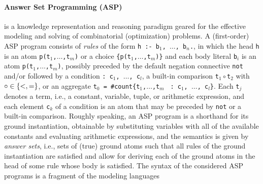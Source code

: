 \documentclass{tlp} %
\begin{document}
\paragraph{Answer Set Programming (ASP)} \citep{lifschitz19a}
is a knowledge representation and reasoning paradigm geared for the effective 
modeling and solving of combinatorial (optimization) problems. %
A (first-order) ASP program consists of \emph{rules} of the form
\lstinline{h :- b}$_1$\lstinline{, }$\dots$\lstinline{, b}$_n$\lstinline{.},
in which the head \lstinline{h} is an atom
\lstinline{p(t}$_1$\lstinline{,}$\dots$\lstinline{,t}$_m$\lstinline{)} or a
choice
\lstinline{{p(t}$_1$\lstinline{,}$\dots$\lstinline{,t}$_m$\lstinline|)}|
and each body literal \lstinline{b}$_i$ is an atom
\lstinline{p(t}$_1$\lstinline{,}$\dots$\lstinline{,t}$_m$\lstinline{)},
possibly preceded by the default negation connective \lstinline{not} and/or
followed by a condition
\lstinline|: c|$_1$\lstinline{, }$\dots$\lstinline{, c}$_l$, 
a built-in comparison \lstinline{t}$_1\circ{}$\lstinline{t}$_2$
with $\circ\in\{\text{\lstinline{<}},\text{\lstinline{=}}\}$,
or an aggregate
\lstinline|t|$_0$\lstinline| = #count{t|$_1$\lstinline{,}$\dots$\lstinline{,t}$_m$%
\lstinline| : c|$_1$\lstinline{, }$\dots$\lstinline{, c}$_l$\lstinline|}|.
Each \lstinline|t|$_j$ denotes a term, i.e., a constant, variable, tuple,
or arithmetic expression, and each element \lstinline|c|$_k$ of a condition is
an atom that may be preceded by \lstinline{not} or a built-in comparison.
Roughly speaking, an ASP program is a shorthand for its ground instantiation,
obtainable by substituting variables with all of the available constants
and evaluating arithmetic expressions,
and the semantics is given by \emph{answer sets}, i.e.,
sets of (true) ground atoms such that all rules of the ground instantiation
are satisfied and allow for deriving each of the ground atoms in the head of
some rule whose body is satisfied.
The syntax of the considered ASP programs is a fragment of the modeling languages
\end{document}
